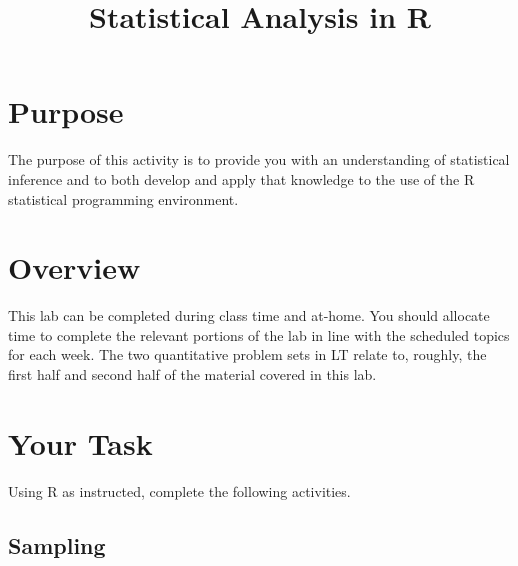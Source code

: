 \documentclass[a4paper,12pt]{article}
\title{Statistical Analysis in R}
\author{}
\date{}
\begin{document}
\vspace{-4em}

\maketitle

\vspace{-4em}

\section{Purpose}

The purpose of this activity is to provide you with an understanding of statistical inference and to both develop and apply that knowledge to the use of the R statistical programming environment.

\section{Overview}

This lab can be completed during class time and at-home. You should allocate time to complete the relevant portions of the lab in line with the scheduled topics for each week. The two quantitative problem sets in LT relate to, roughly, the first half and second half of the material covered in this lab.

\section{Your Task}

Using R as instructed, complete the following activities.

\subsection{Sampling}
\end{document}
